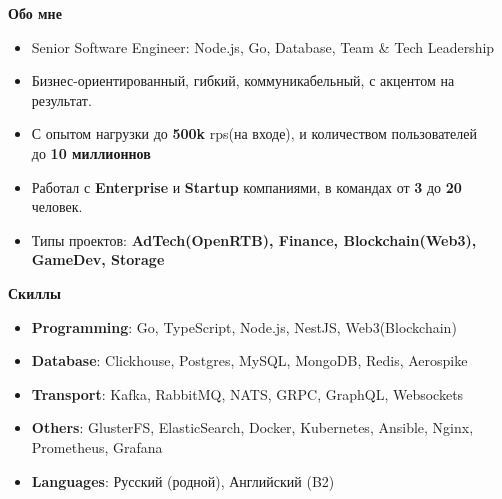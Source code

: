 \documentclass{resume}
\begin{document}

\begin{rSection}{\textbf{Обо мне}}
{
    \begin{itemize}
    \setlength\itemsep{-0.2em}
        \item Senior Software Engineer: Node.js, Go, Database, Team \& Tech Leadership
        \item Бизнес-ориентированный, гибкий, коммуникабельный, с акцентом на результат.
        \item С опытом нагрузки до \textbf{500k} rps(на входе), и количеством пользователей \\ до \textbf{10 миллионнов}
        \item Работал с \textbf{Enterprise} и \textbf{Startup} компаниями, в командах от \textbf{3} до \textbf{20} человек.
        \item Типы проектов: \textbf{AdTech(OpenRTB), Finance, Blockchain(Web3), GameDev, Storage}
    \end{itemize}
}

\end{rSection}
\begin{rSection}{\textbf{Скиллы}}
    \begin{itemize}
    \setlength\itemsep{-0.2em}
        \item \textbf{Programming}: Go, TypeScript, Node.js, NestJS, Web3(Blockchain)
        \item \textbf{Database}: Clickhouse, Postgres, MySQL, MongoDB, Redis, Aerospike
        \item \textbf{Transport}: Kafka, RabbitMQ, NATS, GRPC, GraphQL, Websockets
        \item \textbf{Others}: GlusterFS, ElasticSearch, Docker, Kubernetes, Ansible, Nginx, Prometheus, Grafana
        \item \textbf{Languages}: Русский (родной), Английский (B2)
    \end{itemize}
\end{rSection}
\end{document}
